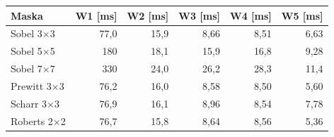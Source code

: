 \begin{tabular}{lrrrrr}
\toprule
Maska & W1 [ms] & W2 [ms] & W3 [ms] & W4 [ms] & W5 [ms] \\
\midrule
Sobel 3$\times$3 & 77,0 & 15,9 & 8,66 & 8,51 & 6,63 \\
Sobel 5$\times$5 & 180 & 18,1 & 15,9 & 16,8 & 9,28 \\
Sobel 7$\times$7 & 330 & 24,0 & 26,2 & 28,3 & 11,4 \\
Prewitt 3$\times$3 & 76,2 & 16,0 & 8,58 & 8,50 & 5,60 \\
Scharr 3$\times$3 & 76,9 & 16,1 & 8,96 & 8,54 & 7,78 \\
Roberts 2$\times$2 & 76,7 & 15,8 & 8,64 & 8,56 & 5,36 \\
\bottomrule
\end{tabular}
